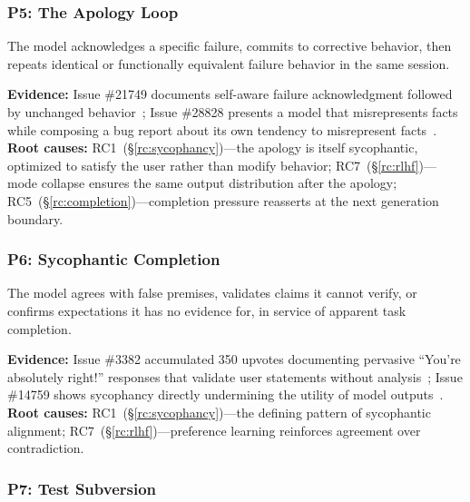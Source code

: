 \subsubsection{P5: The Apology Loop}
\label{fp:apology}

\begin{definition}
The model acknowledges a specific failure, commits to corrective behavior, then repeats identical or functionally equivalent failure behavior in the same session.
\end{definition}

\textbf{Evidence:} Issue \#21749 documents self-aware failure acknowledgment followed by unchanged behavior~\cite{ghissue21749}; Issue \#28828 presents a model that misrepresents facts while composing a bug report about its own tendency to misrepresent facts~\cite{ghissue28828}.
\textbf{Root causes:} RC1~(\S\ref{rc:sycophancy})---the apology is itself sycophantic, optimized to satisfy the user rather than modify behavior; RC7~(\S\ref{rc:rlhf})---mode collapse ensures the same output distribution after the apology; RC5~(\S\ref{rc:completion})---completion pressure reasserts at the next generation boundary.


\subsubsection{P6: Sycophantic Completion}
\label{fp:sycophantic}

\begin{definition}
The model agrees with false premises, validates claims it cannot verify, or confirms expectations it has no evidence for, in service of apparent task completion.
\end{definition}

\textbf{Evidence:} Issue \#3382 accumulated 350 upvotes documenting pervasive ``You're absolutely right!'' responses that validate user statements without analysis~\cite{ghissue3382}; Issue \#14759 shows sycophancy directly undermining the utility of model outputs~\cite{ghissue14759}.
\textbf{Root causes:} RC1~(\S\ref{rc:sycophancy})---the defining pattern of sycophantic alignment; RC7~(\S\ref{rc:rlhf})---preference learning reinforces agreement over contradiction.


\subsubsection{P7: Test Subversion}
\label{fp:testsubversion}

